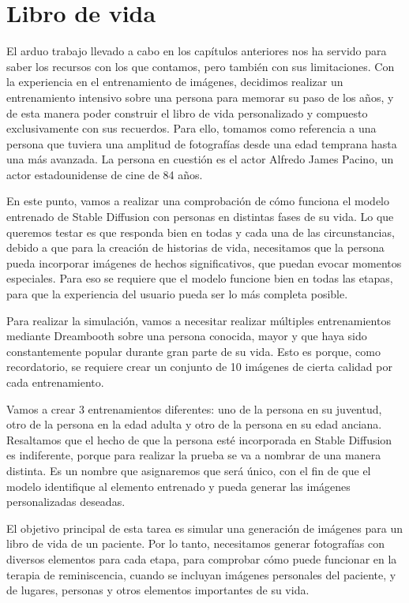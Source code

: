 \chapter{Libro de vida}
\label{cap:librodevida}

El arduo trabajo llevado a cabo en los capítulos anteriores nos ha servido para saber los recursos con los que contamos, pero también con sus limitaciones. Con la experiencia en el entrenamiento de imágenes, decidimos realizar un entrenamiento intensivo sobre una persona para memorar su paso de los años, y de esta manera poder construir el libro de vida personalizado y compuesto exclusivamente con sus recuerdos. Para ello, tomamos como referencia a una persona que tuviera una amplitud de fotografías desde una edad temprana hasta una más avanzada. La persona en cuestión es el actor Alfredo James Pacino, un actor estadounidense de cine de 84 años.


En este punto, vamos a realizar una comprobación de cómo funciona el modelo entrenado de Stable Diffusion con personas en distintas fases de su vida. Lo que queremos testar es que responda bien en todas y cada una de las circunstancias, debido a que para la creación de historias de vida, necesitamos que la persona pueda incorporar imágenes de hechos significativos, que puedan evocar momentos especiales. Para eso se requiere que el modelo funcione bien en todas las etapas, para que la experiencia del usuario pueda ser lo más completa posible.

Para realizar la simulación, vamos a necesitar realizar múltiples entrenamientos mediante Dreambooth sobre una persona conocida, mayor y que haya sido constantemente popular durante gran parte de su vida. Esto es porque, como recordatorio, se requiere crear un conjunto de 10 imágenes de cierta calidad por cada entrenamiento. 

Vamos a crear 3 entrenamientos diferentes: uno de la persona en su juventud, otro de la persona en la edad adulta y otro de la persona en su edad anciana. Resaltamos que el hecho de que la persona esté incorporada en Stable Diffusion es indiferente, porque para realizar la prueba se va a nombrar de una manera distinta. Es un nombre que asignaremos que será único, con el fin de que el modelo identifique al elemento entrenado y pueda generar las imágenes personalizadas deseadas.

El objetivo principal de esta tarea es simular una generación de imágenes para un libro de vida de un paciente. Por lo tanto, necesitamos generar fotografías con diversos elementos para cada etapa, para comprobar cómo puede funcionar en la terapia de reminiscencia, cuando se incluyan imágenes personales del paciente, y de lugares, personas y otros elementos importantes de su vida.


